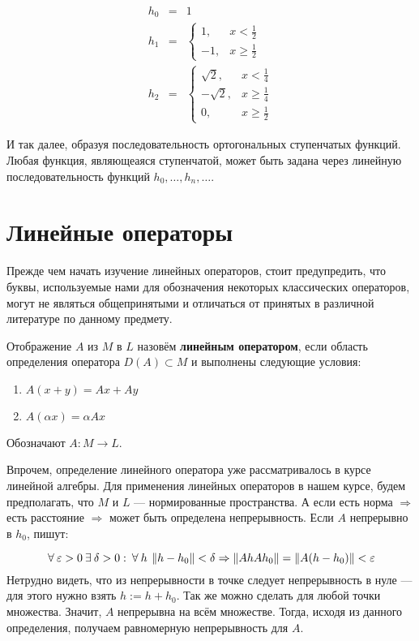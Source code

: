 	\begin{eqnarray*}
		h_0& =& 1 \\		
		h_1& =& 
		\begin{cases}
			1, & x < \frac{1}{2} \\
			-1, & x \geq \frac{1}{2}
		\end{cases} \\		
		h_2& =& 
		\begin{cases}
			\sqrt{2}, & x < \frac{1}{4} \\
			-\sqrt{2}, & x \geq \frac{1}{4} \\
			0, & x \geq \frac{1}{2}
		\end{cases}
	\end{eqnarray*}
	
	И так далее, образуя последовательность ортогональных ступенчатых функций. Любая функция, являющеаяся ступенчатой, может
	быть задана через линейную последовательность функций $h_0, \dots, h_n, \dots$.
	
	\section{Линейные операторы}
	
	Прежде чем начать изучение линейных операторов, стоит предупредить, что буквы, используемые нами для обозначения некоторых
	классических операторов, могут не являться общепринятыми и отличаться от принятых в различной литературе по данному предмету.
	
	\begin{defi}
		Отображение $A$ из $M$ в $L$ назовём \textbf{линейным оператором}, если область определения оператора
		$D(A) \subset M$ и выполнены следующие условия:
		\begin{enumerate}
			\item $A(x + y) = Ax + Ay$
			\item $A(\alpha x) = \alpha A x$ 
		\end{enumerate}
		Обозначают $A : M \rightarrow L$.
	\end{defi}
	
	Впрочем, определение линейного оператора уже рассматривалось в курсе линейной алгебры. Для применения линейных операторов в
	нашем курсе, будем предполагать, что $M$ и $L$ --- нормированные пространства. А если есть норма $\Rightarrow$ есть расстояние
	$\Rightarrow$ может быть определена непрерывность. Если $A$ непрерывно в $h_0$, пишут:
	
	$$ \forall \varepsilon > 0 \exists \delta > 0 : \forall h \: \norm{h - h_0} < \delta \Rightarrow \norm{Ah  Ah_0} 
	= \norm{A(h-h_0)} < \varepsilon $$
	Нетрудно видеть, что из непрерывности в точке следует непрерывность в нуле --- для этого нужно взять $h := h + h_0$. 
	Так же можно сделать для любой точки множества. Значит, $A$ непрерывна на всём множестве. Тогда, исходя из данного
	определения, получаем равномерную непрерывность для $A$.
	
